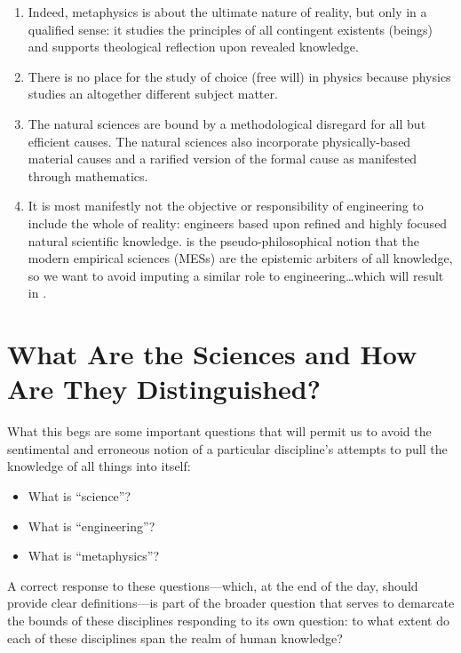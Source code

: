 \begin{enumerate}
\item Indeed, metaphysics is about the ultimate nature of reality, but only in a qualified sense: it studies the principles of all contingent existents (beings) and supports theological reflection upon revealed knowledge.
\item There is no place for the study of choice (free will) in physics because physics studies an altogether different subject matter.
\item The natural sciences are  bound by a methodological disregard for all but efficient causes. The natural sciences also incorporate physically-based material causes and a rarified version of the formal cause as manifested through mathematics.
\item It is most manifestly not the objective or responsibility of engineering to include the whole of reality: engineers  based upon refined and highly focused natural scientific knowledge.  is the pseudo-philosophical notion that the modern empirical sciences (MESs) are the epistemic arbiters of all knowledge, so we want to avoid imputing a similar role to engineering\ldots which will result in .
\end{enumerate}

\section{What Are the Sciences and How Are They Distinguished?}

What this begs are some important questions that will permit us to avoid the sentimental and erroneous notion of a particular discipline’s attempts to pull the knowledge of all things into itself:

\begin{itemize}
\item What is ``science''?
\item What is ``engineering''?
\item What is ``metaphysics''?
\end{itemize}

A correct response to these questions---which, at the end of the day, should provide clear definitions---is part of the broader question that serves to demarcate the bounds of these disciplines responding to its own question: to what extent do each of these disciplines span the realm of human knowledge?

